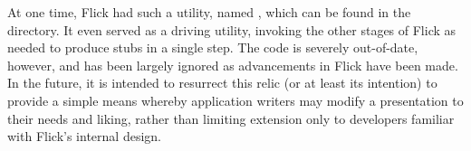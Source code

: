At one time, Flick had such a utility, named , which can be found
in the  directory.  It even served as a driving utility,
invoking the other stages of Flick as needed to produce stubs in a single step.
The code is severely out-of-date, however, and has been largely ignored as
advancements in Flick have been made.  In the future, it is intended to
resurrect this relic (or at least its intention) to provide a simple means
whereby application writers may modify a presentation to their needs and
liking, rather than limiting extension only to developers familiar with Flick's
internal design.



